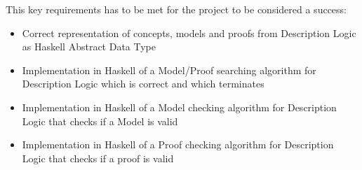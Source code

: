 This key requirements has to be met for the project to be considered a success:

\begin{itemize}
\item Correct representation of concepts, models and proofs from Description Logic as Haskell Abstract Data Type
\item Implementation in Haskell of a Model/Proof searching algorithm for Description Logic which is correct and which terminates
\item Implementation in Haskell of a Model checking algorithm for Description Logic that checks
if a Model is valid
\item Implementation in Haskell of a Proof checking algorithm for Description Logic that checks if a proof is valid
\end{itemize}

